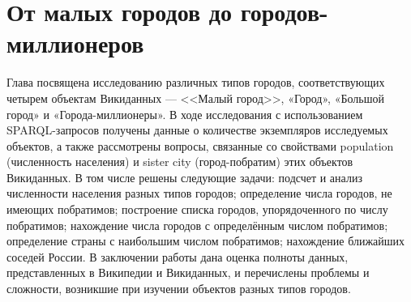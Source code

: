 \chapter{От малых городов до городов-миллионеров}
\label{ch:city}

Глава посвящена исследованию различных типов городов, соответствующих четырем объектам Викиданных — <<Малый город>>, «Город», «Большой город» и «Города-миллионеры». В ходе исследования с использованием SPARQL-запросов получены данные о количестве экземпляров исследуемых объектов, а также рассмотрены вопросы, связанные со свойствами population (численность населения) и sister city (город-побратим) этих объектов Викиданных. В том числе решены следующие задачи: подсчет и анализ численности населения разных типов городов; определение числа городов, не имеющих побратимов; построение списка городов, упорядоченного по числу побратимов; нахождение числа городов с определённым числом побратимов; определение страны с наибольшим числом побратимов; нахождение ближайших соседей России. В заключении работы дана оценка полноты данных, представленных в Википедии и Викиданных, и перечислены проблемы и сложности, возникшие при изучении объектов разных типов городов.
